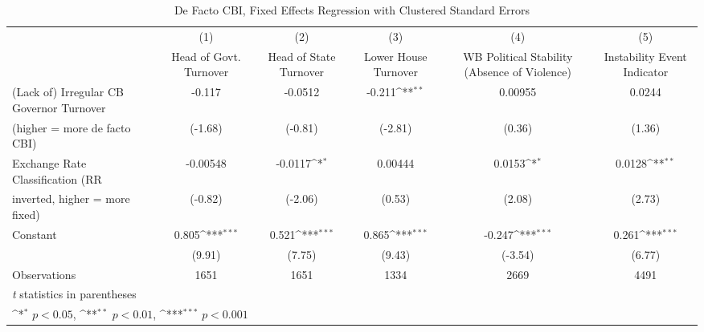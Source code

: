 \begin{table}[htbp]\centering
\def\sym#1{\ifmmode^{#1}\else\(^{#1}\)\fi}
\caption{De Facto CBI, Fixed Effects Regression with Clustered Standard Errors \label{multIndFEDF}}
\begin{tabular}{l*{5}{c}}
\toprule
                                        &\multicolumn{1}{c}{(1)}&\multicolumn{1}{c}{(2)}&\multicolumn{1}{c}{(3)}&\multicolumn{1}{c}{(4)}&\multicolumn{1}{c}{(5)}\\
                                        &\multicolumn{1}{c}{Head of Govt. Turnover}&\multicolumn{1}{c}{Head of State Turnover}&\multicolumn{1}{c}{Lower House Turnover}&\multicolumn{1}{c}{WB Political Stability (Absence of Violence)}&\multicolumn{1}{c}{Instability Event Indicator}\\
\midrule
(Lack of) Irregular CB Governor Turnover&-0.117         &-0.0512         &-0.211\sym{**} &0.00955         &0.0244         \\
(higher = more de facto CBI)            &(-1.68)         &(-0.81)         &(-2.81)         &(0.36)         &(1.36)         \\
\addlinespace
Exchange Rate Classification (RR        &-0.00548         &-0.0117\sym{*}  &0.00444         &0.0153\sym{*}  &0.0128\sym{**} \\
inverted, higher = more fixed)          &(-0.82)         &(-2.06)         &(0.53)         &(2.08)         &(2.73)         \\
\addlinespace
Constant                                &0.805\sym{***}&0.521\sym{***}&0.865\sym{***}&-0.247\sym{***}&0.261\sym{***}\\
                                        &(9.91)         &(7.75)         &(9.43)         &(-3.54)         &(6.77)         \\
\midrule
Observations                            & 1651         & 1651         & 1334         & 2669         & 4491         \\
\bottomrule
\multicolumn{6}{l}{\footnotesize \textit{t} statistics in parentheses}\\
\multicolumn{6}{l}{\footnotesize \sym{*} \(p<0.05\), \sym{**} \(p<0.01\), \sym{***} \(p<0.001\)}\\
\end{tabular}
\end{table}
